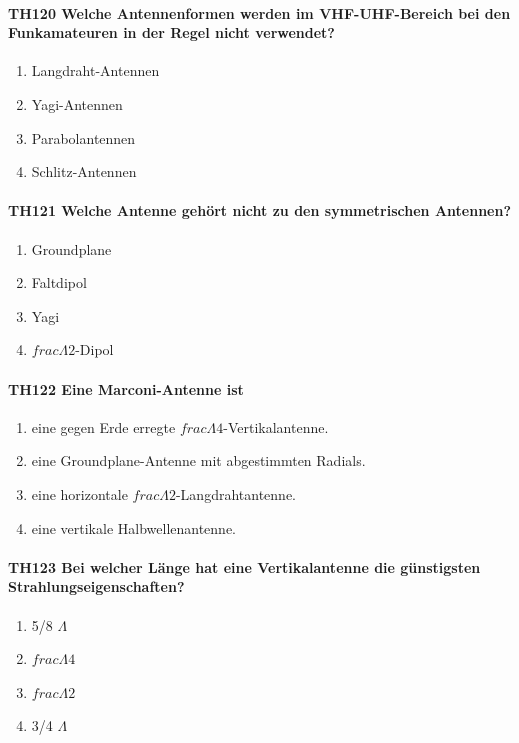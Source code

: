 \documentclass[8pt]{article}
\begin{document}
\paragraph*{TH120 Welche Antennenformen werden im VHF-UHF-Bereich bei den Funkamateuren in der Regel nicht verwendet?}
\begin{enumerate}[nolistsep,label=\Alph*]
\item Langdraht-Antennen
\item Yagi-Antennen
\item Parabolantennen
\item Schlitz-Antennen
\end{enumerate}

\paragraph*{TH121 Welche Antenne gehört nicht zu den symmetrischen Antennen?}
\begin{enumerate}[nolistsep,label=\Alph*]
\item Groundplane
\item Faltdipol
\item Yagi
\item $frac{\Lambda}{2}$-Dipol
\end{enumerate}

\paragraph*{TH122 Eine Marconi-Antenne ist} 
\begin{enumerate}[nolistsep,label=\Alph*]
\item eine gegen Erde erregte $frac{\Lambda}{4}$-Vertikalantenne.
\item eine Groundplane-Antenne mit abgestimmten Radials.
\item eine horizontale $frac{\Lambda}{2}$-Langdrahtantenne.
\item eine vertikale Halbwellenantenne.
\end{enumerate}

\paragraph*{TH123 Bei welcher Länge hat eine Vertikalantenne die günstigsten Strahlungseigenschaften?}
\begin{enumerate}[nolistsep,label=\Alph*]
\item 5/8 $\Lambda$
\item $frac{\Lambda}{4}$
\item $frac{\Lambda}{2}$
\item 3/4 $\Lambda$
\end{enumerate}
\end{document}

